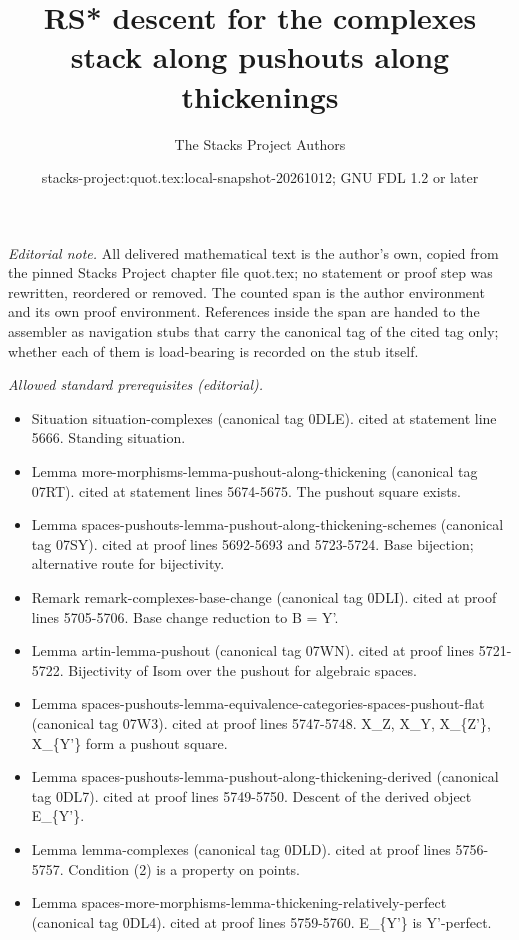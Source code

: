 \documentclass{stacks-project}
\title{RS* descent for the complexes stack along pushouts along thickenings}
\author{The Stacks Project Authors}
\date{stacks-project:quot.tex:local-snapshot-20261012; GNU FDL 1.2 or later}
\theoremstyle{plain}
\theoremstyle{definition}
\theoremstyle{remark}
\numberwithin{equation}{subsection}
\begin{document}
\maketitle
\setcounter{subsection}{1}
\noindent\textit{Editorial note.} All delivered mathematical text is the author's own, copied from the pinned Stacks Project chapter file quot.tex; no statement or proof step was rewritten, reordered or removed. The counted span is the author environment and its own proof environment. References inside the span are handed to the assembler as navigation stubs that carry the canonical tag of the cited tag only; whether each of them is load-bearing is recorded on the stub itself.\par\medskip
\noindent\textit{Allowed standard prerequisites (editorial).}\begin{itemize}
\item Situation situation-complexes (canonical tag 0DLE). cited at statement line 5666. Standing situation.
\item Lemma more-morphisms-lemma-pushout-along-thickening (canonical tag 07RT). cited at statement lines 5674-5675. The pushout square exists.
\item Lemma spaces-pushouts-lemma-pushout-along-thickening-schemes (canonical tag 07SY). cited at proof lines 5692-5693 and 5723-5724. Base bijection; alternative route for bijectivity.
\item Remark remark-complexes-base-change (canonical tag 0DLI). cited at proof lines 5705-5706. Base change reduction to B = Y'.
\item Lemma artin-lemma-pushout (canonical tag 07WN). cited at proof lines 5721-5722. Bijectivity of Isom over the pushout for algebraic spaces.
\item Lemma spaces-pushouts-lemma-equivalence-categories-spaces-pushout-flat (canonical tag 07W3). cited at proof lines 5747-5748. X\_Z, X\_Y, X\_\{Z'\}, X\_\{Y'\} form a pushout square.
\item Lemma spaces-pushouts-lemma-pushout-along-thickening-derived (canonical tag 0DL7). cited at proof lines 5749-5750. Descent of the derived object E\_\{Y'\}.
\item Lemma lemma-complexes (canonical tag 0DLD). cited at proof lines 5756-5757. Condition (2) is a property on points.
\item Lemma spaces-more-morphisms-lemma-thickening-relatively-perfect (canonical tag 0DL4). cited at proof lines 5759-5760. E\_\{Y'\} is Y'-perfect.
\end{itemize}\medskip
\end{document}
